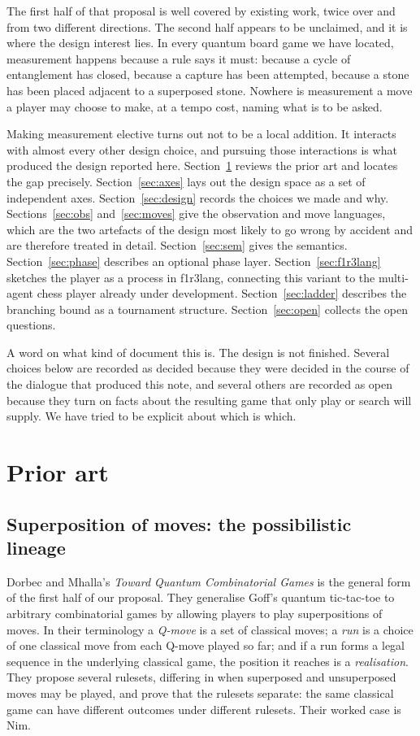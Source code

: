 \documentclass[11pt,a4paper]{article}
\theoremstyle{definition}
\theoremstyle{plain}
\begin{document}
The first half of that proposal is well covered by existing work, twice over
and from two different directions. The second half appears to be unclaimed, and
it is where the design interest lies. In every quantum board game we have
located, measurement happens because a rule says it must: because a cycle of
entanglement has closed, because a capture has been attempted, because a stone
has been placed adjacent to a superposed stone. Nowhere is measurement a move a
player may choose to make, at a tempo cost, naming what is to be asked.

Making measurement elective turns out not to be a local addition. It interacts
with almost every other design choice, and pursuing those interactions is what
produced the design reported here. Section~\ref{sec:prior} reviews the prior
art and locates the gap precisely. Section~\ref{sec:axes} lays out the design
space as a set of independent axes. Section~\ref{sec:design} records the
choices we made and why. Sections~\ref{sec:obs} and~\ref{sec:moves} give the
observation and move languages, which are the two artefacts of the design most
likely to go wrong by accident and are therefore treated in detail.
Section~\ref{sec:sem} gives the semantics. Section~\ref{sec:phase} describes an
optional phase layer. Section~\ref{sec:f1r3lang} sketches the player as a
process in f1r3lang, connecting this variant to the multi-agent chess player
already under development. Section~\ref{sec:ladder} describes the branching
bound as a tournament structure. Section~\ref{sec:open} collects the open
questions.

A word on what kind of document this is. The design is not finished. Several
choices below are recorded as decided because they were decided in the course
of the dialogue that produced this note, and several others are recorded as
open because they turn on facts about the resulting game that only play or
search will supply. We have tried to be explicit about which is which.

\section{Prior art}
\label{sec:prior}

\subsection{Superposition of moves: the possibilistic lineage}

Dorbec and Mhalla's \emph{Toward Quantum Combinatorial Games}
\cite{dorbec2017} is the general form of the first half of our proposal. They
generalise Goff's quantum tic-tac-toe \cite{goff2006} to arbitrary
combinatorial games by allowing players to play superpositions of moves. In
their terminology a \emph{Q-move} is a set of classical moves; a \emph{run} is
a choice of one classical move from each Q-move played so far; and if a run
forms a legal sequence in the underlying classical game, the position it
reaches is a \emph{realisation}. They propose several rulesets, differing in
when superposed and unsuperposed moves may be played, and prove that the
rulesets separate: the same classical game can have different outcomes under
different rulesets. Their worked case is Nim.
\end{document}
